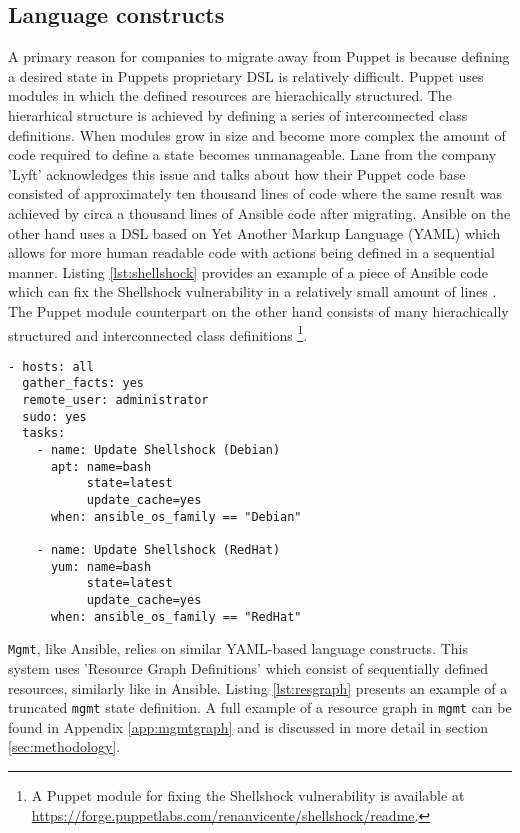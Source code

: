 \subsection{Language constructs}
A primary reason for companies to migrate away from Puppet is because defining a desired state in Puppets proprietary DSL is relatively difficult. Puppet uses modules in which the defined resources are hierachically structured. The hierarhical structure is achieved by defining a series of interconnected class definitions. When modules grow in size and become more complex the amount of code required to define a state becomes unmanageable. Lane \cite{movingawayfrompuppet} from the company 'Lyft' acknowledges this issue and talks about how their Puppet code base consisted of approximately ten thousand lines of code where the same result was achieved by circa a thousand lines of Ansible code after migrating. Ansible on the other hand uses a DSL based on Yet Another Markup Language (YAML) which allows for more human readable code with actions being defined in a sequential manner. Listing \ref{lst:shellshock} provides an example of a piece of Ansible code which can fix the Shellshock vulnerability in a relatively small amount of lines \cite{severdensity_2015}. The Puppet module counterpart on the other hand consists of many hierachically structured and interconnected class definitions \footnote{A Puppet module for fixing the Shellshock vulnerability is available at \url{https://forge.puppetlabs.com/renanvicente/shellshock/readme}.}.
\\
\begin{lstlisting}[caption={Shellshock security patching with Ansible playbook},label=lst:shellshock]
- hosts: all
  gather_facts: yes
  remote_user: administrator
  sudo: yes
  tasks:
    - name: Update Shellshock (Debian)
      apt: name=bash
           state=latest
           update_cache=yes
      when: ansible_os_family == "Debian"

    - name: Update Shellshock (RedHat)
      yum: name=bash
           state=latest
           update_cache=yes
      when: ansible_os_family == "RedHat"
\end{lstlisting}
\noindent
\texttt{Mgmt}, like Ansible, relies on similar YAML-based language constructs. This system uses 'Resource Graph Definitions' which consist of sequentially defined resources, similarly like in Ansible. Listing \ref{lst:resgraph} presents an example of a truncated \texttt{mgmt} state definition. A full example of a resource graph in \texttt{mgmt} can be found in Appendix \ref{app:mgmtgraph} and is discussed in more detail in section \ref{sec:methodology}.
